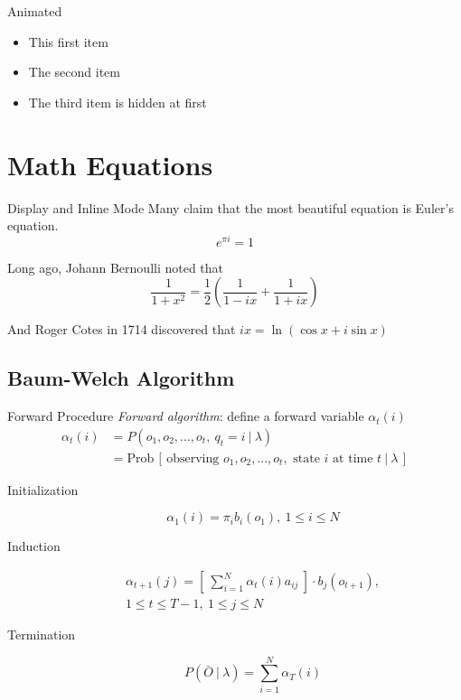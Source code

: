 \documentclass[10pt]{beamer}
\begin{document}
\begin{frame}{Animated}
  \begin{itemize}
    \item <1-> This first item
    \item <1-> The second item
    \item <2-> The third item is hidden at first
  \end{itemize}
\end{frame}

\section{Math Equations}

\begin{frame}{Display and Inline Mode}
  Many claim that the most beautiful equation is Euler's equation.
  \[ e^{\pi i} = 1 \]

  Long ago, Johann Bernoulli noted that
  $$ \frac{1}{1+x^2} = \frac{1}{2}\left( \frac{1}{1-ix} + \frac{1}{1+ix} \right) $$

  And Roger Cotes in 1714 discovered that $ ix = \ln(\cos x + i \sin x) $
\end{frame}

\subsection{Baum-Welch Algorithm}

\begin{frame}{Forward Procedure}
  \textit{Forward algorithm}: define a forward variable $\alpha_t(i)$
  \begin{align}
    \alpha_t (i)
     & = P(o_1, o_2, \dots, o_t,\ q_t = i\ |\ \lambda)                                                              \\
     & = \text{Prob}\,[\,\text{observing } o_1, o_2, \dots, o_t, \text{ state } i \text{ at time } t\ |\ \lambda\,]
  \end{align}

  \begin{description}
    \item[Initialization]
          \begin{equation}
            \alpha_1(i) = \pi_i b_i (o_1),\ 1 \leq i \leq N
          \end{equation}
    \item[Induction]
          \begin{multline}
            \alpha_{t+1}(j) = \left[\ \sum_{i=1}^{N} \alpha_t(i) a_{i j}\ \right] \cdot b_j(o_{t+1}),\\
            1 \leq t \leq T-1,\ 1 \leq j \leq N
          \end{multline}
    \item[Termination]
          \begin{equation}
            P\left( \bar{O}\ |\ \lambda \right) = \sum_{i=1}^{N} \alpha_T(i)
          \end{equation}
  \end{description}
\end{frame}
\end{document}
